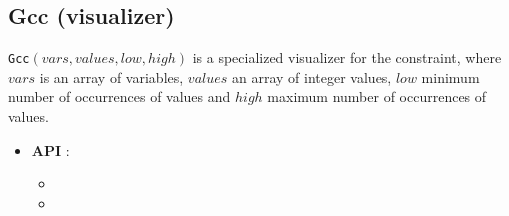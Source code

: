 \subsection{Gcc (visualizer)}\label{gcc:visu}\hypertarget{gcc:visu}{}
\begin{notedef}
  \texttt{Gcc}$(vars, values, low, high)$ is a specialized visualizer for the  constraint, where $vars$ is an array of variables, $values$ an array of integer values, $low$ minimum number of occurrences of values and $high$ maximum number of occurrences of values.
\end{notedef}

\begin{itemize}
	\item \textbf{API} : 
	\begin{itemize}
	\item {}
	\item {}
	\end{itemize}
\end{itemize}

%

